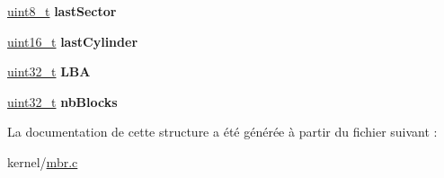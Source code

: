 \begin{DoxyCompactItemize}
\item 
\hypertarget{struct__PartitionDescriptor_a3630bb7241f436168573845c5f0fb51c}{\hyperlink{kernel_2include_2types_8h_aba7bc1797add20fe3efdf37ced1182c5}{uint8\+\_\+t} {\bfseries last\+Sector}}\label{struct__PartitionDescriptor_a3630bb7241f436168573845c5f0fb51c}

\item 
\hypertarget{struct__PartitionDescriptor_ae41ef6da9ade744a36f58a1e5ece36f7}{\hyperlink{kernel_2include_2types_8h_adf4d876453337156dde61095e1f20223}{uint16\+\_\+t} {\bfseries last\+Cylinder}}\label{struct__PartitionDescriptor_ae41ef6da9ade744a36f58a1e5ece36f7}

\item 
\hypertarget{struct__PartitionDescriptor_ae0a54b137da361739f30ce3a33f46379}{\hyperlink{kernel_2include_2types_8h_a33594304e786b158f3fb30289278f5af}{uint32\+\_\+t} {\bfseries L\+B\+A}}\label{struct__PartitionDescriptor_ae0a54b137da361739f30ce3a33f46379}

\item 
\hypertarget{struct__PartitionDescriptor_a48615506f84f0b810db3d15fbcbbfe2f}{\hyperlink{kernel_2include_2types_8h_a33594304e786b158f3fb30289278f5af}{uint32\+\_\+t} {\bfseries nb\+Blocks}}\label{struct__PartitionDescriptor_a48615506f84f0b810db3d15fbcbbfe2f}

\end{DoxyCompactItemize}


La documentation de cette structure a été générée à partir du fichier suivant \+:\begin{DoxyCompactItemize}
\item 
kernel/\hyperlink{mbr_8c}{mbr.\+c}\end{DoxyCompactItemize}
